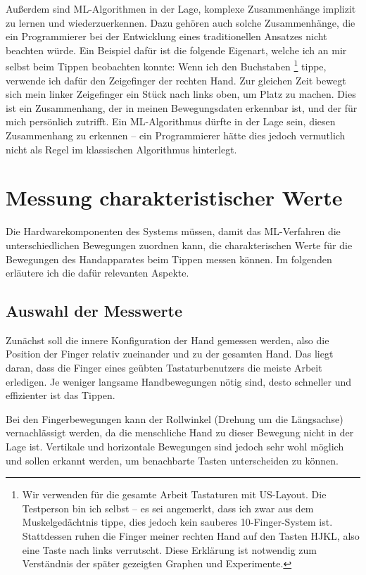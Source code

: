 Außerdem sind ML-Algorithmen in der Lage, komplexe Zusammenhänge implizit zu
lernen und wiederzuerkennen. Dazu gehören auch solche Zusammenhänge, die ein
Programmierer bei der Entwicklung eines traditionellen Ansatzes nicht beachten
würde. Ein Beispiel dafür ist die folgende Eigenart, welche ich an mir selbst
beim Tippen beobachten konnte: Wenn ich den Buchstaben
\footnote{Wir verwenden für die gesamte Arbeit Tastaturen mit
US-Layout. Die Testperson bin ich selbst -- es sei angemerkt, dass ich zwar aus
dem Muskelgedächtnis tippe, dies jedoch kein sauberes 10-Finger-System ist.
Stattdessen ruhen die Finger meiner rechten Hand auf den Tasten HJKL, also eine
Taste nach links verrutscht. Diese Erklärung ist notwendig zum Verständnis der
später gezeigten Graphen und Experimente.} tippe, verwende ich dafür den
Zeigefinger der rechten Hand.  Zur gleichen Zeit bewegt sich mein linker
Zeigefinger ein Stück nach links oben, um Platz zu machen. Dies ist ein
Zusammenhang, der in meinen Bewegungsdaten erkennbar ist, und der für mich
persönlich zutrifft. Ein ML-Algorithmus dürfte in der Lage sein, diesen
Zusammenhang zu erkennen -- ein Programmierer hätte dies jedoch vermutlich
nicht als Regel im klassischen Algorithmus hinterlegt.

\section{Messung charakteristischer Werte}

Die Hardwarekomponenten des Systems müssen, damit das ML-Verfahren die
unterschiedlichen Bewegungen zuordnen kann, die charakterischen Werte für die
Bewegungen des Handapparates beim Tippen messen können. Im folgenden erläutere
ich die dafür relevanten Aspekte.

\subsection{Auswahl der Messwerte}

Zunächst soll die innere Konfiguration der Hand gemessen werden, also die
Position der Finger relativ zueinander und zu der gesamten Hand. Das liegt
daran, dass die Finger eines geübten Tastaturbenutzers die meiste Arbeit
erledigen. Je weniger langsame Handbewegungen nötig sind, desto schneller und
effizienter ist das Tippen.

Bei den Fingerbewegungen kann der Rollwinkel (Drehung um die Längsachse)
vernachlässigt werden, da die menschliche Hand zu dieser Bewegung nicht in der
Lage ist. Vertikale und horizontale Bewegungen sind jedoch sehr wohl möglich
und sollen erkannt werden, um benachbarte Tasten unterscheiden zu können.

